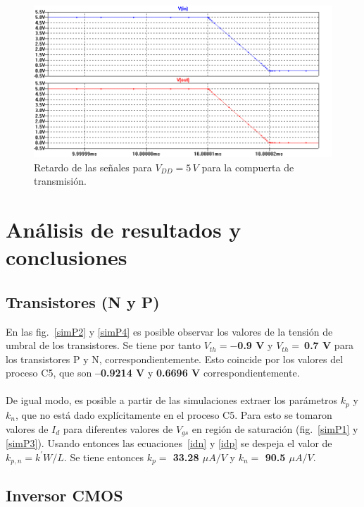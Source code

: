 \documentclass[twocolumn]{IEEEtran}
\begin{document}
\begin{figure}[H]
  \centering
    \includegraphics[scale=0.3]{pics/delay3.png}
      \caption{Retardo de las señales para $V_{DD}=5\, V$ para la compuerta de transmisión.}
	\label{delay3}
\end{figure}
\noindent

\section{Análisis de resultados y conclusiones}

\subsection{Transistores (N y P)}
\noindent
En las fig.~\ref{simP2} y \ref{simP4} es posible observar los valores de la tensión de umbral de los transistores. Se tiene por tanto \textbf{$V_{th}=-$0.9 V} y \textbf{$V_{th}=\ $0.7 V} para los transistores P y N, correspondientemente. Esto coincide por los valores del proceso C5, que son \textbf{--0.9214 V} y \textbf{0.6696 V} correspondientemente.\\\\
De igual modo, es posible a partir de las simulaciones extraer los parámetros $k_p$ y $k_n$, que no está dado explícitamente en el proceso C5. Para esto se tomaron valores de $I_d$ para diferentes valores de $V_{gs}$ en región de saturación (fig.~\ref{simP1} y \ref{simP3}). Usando entonces las ecuaciones~\ref{idn} y \ref{idp} se despeja el valor de $k_{p,n}=k^{'}W/L$. Se tiene entonces \textbf{$k_p=$ 33.28 $\mu A/V$} y \textbf{$k_n=$ 90.5 $\mu A/V$}.

\subsection{Inversor CMOS}
\end{document}
